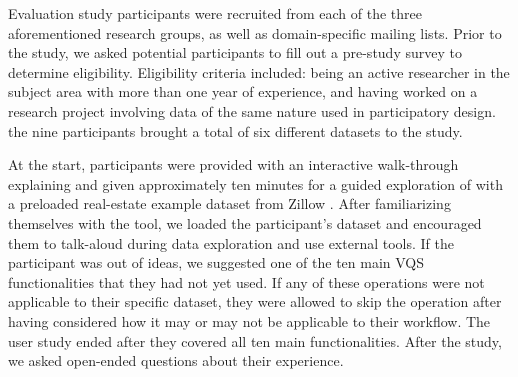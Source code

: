 \par Evaluation study participants were recruited from each of the three aforementioned research groups, as well as domain-specific mailing lists. Prior to the study, we asked potential participants to fill out a pre-study survey to determine eligibility. Eligibility criteria included: being an active researcher in the subject area with more than one year of experience, and having worked on a research project involving data of the same nature used in participatory design.   the nine participants brought a total of six different datasets to the study. 
\par At the start, participants were provided with an interactive walk-through explaining  and given approximately ten minutes for a guided exploration of \zvpp with a preloaded real-estate example dataset from Zillow \cite{zillow}. After familiarizing themselves with the tool, we loaded the participant's dataset and encouraged them to talk-aloud during data exploration and use external tools. If the participant was out of ideas, we suggested one of the ten main VQS functionalities that they had not yet used. If any of these operations were not applicable to their specific dataset, they were allowed to skip the operation after having considered how it may or may not be applicable to their workflow. The user study ended after they covered all ten main functionalities. After the study, we asked  open-ended questions about their experience.%
